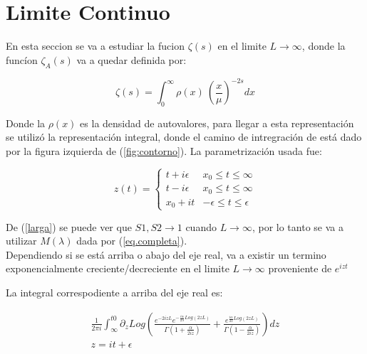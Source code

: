 \chapter{Limite Continuo}

En esta seccion se va a estudiar la fucion $\zeta (s) $ en el limite $L \rightarrow \infty$, donde la funcíon $\zeta _A (s)$ va a quedar definida por:

\begin{equation}
\zeta (s) = \int _{0} ^{\infty} \rho (x) \ \left( \frac{x}{\mu } \right) ^{-2 s} dx
\end{equation}

Donde la $\rho(x) $ es la densidad de autovalores, para llegar a esta representación se utilizó la representación integral, donde el camino de intregración de está dado por la figura izquierda de (\ref{fig:contorno}). La parametrización usada fue:


\[
z(t) =  
	  \begin{cases} 
      t + i \epsilon  & x _0 \leq t \leq \infty \\
      t - i \epsilon  & x _0 \leq t \leq \infty \\
      x _0 + i t		  & - \epsilon \leq t \leq \epsilon
   \end{cases}
\]

De (\ref{larga}) se puede ver que $S1,S2 \rightarrow 1$ cuando $L \rightarrow \infty$, por lo tanto se va a utilizar $M ( \lambda)$ dada por (\ref{eq.completa}).\\



Dependiendo si se está arriba o abajo del eje real, va a existir un termino exponencialmente creciente/decreciente en el limite $L \rightarrow \infty$ proveniente de $e ^{i z t}$

La integral correspodiente a arriba del eje real es:

\begin{equation}
\begin{array}{c}
\frac{ 1 }{2 \pi i} \int _{\infty} ^{t0} 
\partial _z
Log
\left(
\frac{e ^{-2 i z  L } e ^{- \frac{i \alpha}{2 \lambda} Log \left( 2 z  L \right) } }
	 {\Gamma \left( 1 + \frac{ \alpha}{2 i z } \right)} +
\frac{e ^{ \frac{i \alpha}{2 z } Log \left( 2 z  L \right)  } }{\Gamma \left( 1 - \frac{ \alpha}{2 i z } \right) }
\right) d z \\
z = i t + \epsilon 
\end{array}
\end{equation}

